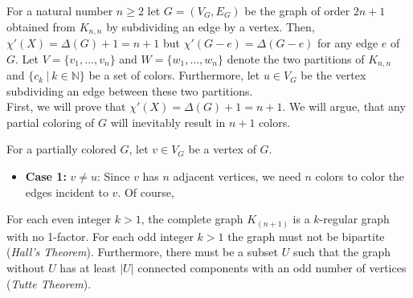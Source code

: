 \documentclass[a4paper]{article}
\begin{document}
	\begin{solution}{10}
		\begin{theorem}{For a natural number $n \geq 2$ let $G = (V_G, E_G)$ be the graph of order $2n + 1$ obtained from $K_{n,n}$ by subdividing an edge by a vertex. Then, $\chi'(X) = \Delta(G) + 1 = n + 1$ but $\chi'(G - e) = \Delta(G - e)$ for any edge $e$ of $G$.}
			Let $V = \{v_1, ..., v_n\}$ and $W = \{w_1, ..., w_n\}$ denote the two partitions of $K_{n, n}$ and $\{c_k\ |\ k \in \mathbb{N}\}$ be a set of colors. Furthermore, let $u \in V_G$ be the vertex subdividing an edge between these two partitions.\\
		
			First, we will prove that $\chi'(X) = \Delta(G) + 1 = n + 1$. We will argue, that any partial coloring of $G$ will inevitably result in $n+1$ colors. 
%

			\begin{center}
			\end{center}

			For a partially colored $G$, let $v \in V_G$ be a vertex of $G$.
			\begin{itemize}
				\item \textbf{Case 1:} $v \neq u$: Since $v$ has $n$ adjacent vertices, we need $n$ colors to color the edges incident to $v$. Of course, 
			\end{itemize}
		\end{theorem}
	\end{solution} 
	\newpage
	\begin{solution}{11}
		For each even integer $k > 1$, the complete graph $K_{(n+1)}$ is a $k$-regular graph with no 1-factor. For each odd integer $k > 1$ the graph must not be bipartite (\emph{Hall's Theorem}). Furthermore, there must be a subset $U$ such that the graph without $U$ has at least $|U|$ connected components with an odd number of vertices (\emph{Tutte Theorem}).
	\end{solution} 
	\newpage
	\begin{solution}{12}
		
	\end{solution}
	
\end{document}
